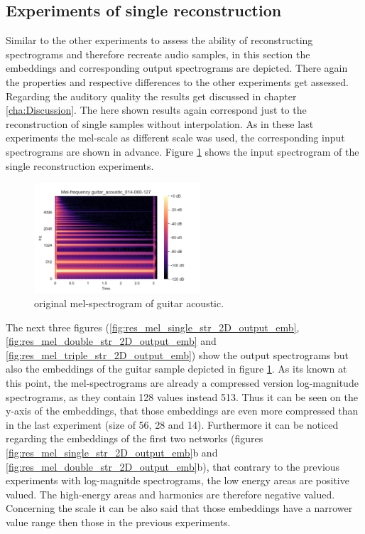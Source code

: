 \subsection{Experiments of single reconstruction}
Similar to the other experiments to assess the ability of reconstructing spectrograms and therefore recreate audio samples, in this section the embeddings and corresponding output spectrograms are depicted. There again the properties and respective differences to the other experiments get assessed. Regarding the auditory quality the results get discussed in chapter \ref{cha:Discussion}. The here shown results again correspond just to the reconstruction of single samples without interpolation. As in these last experiments the mel-scale as different scale was used, the corresponding input spectrograms are shown in advance. Figure \ref{fig:res_2D_mel_guit} shows the input spectrogram of the single reconstruction experiments.

\begin{figure}[htb!]
    \centering
    \includegraphics[width=0.55\textwidth]{images/results/mel_guitar_acoustic_014-060-127.png}
    \caption{original mel-spectrogram of guitar acoustic.}
    \label{fig:res_2D_mel_guit}
\end{figure}

The next three figures (\ref{fig:res_mel_single_str_2D_output_emb}, \ref{fig:res_mel_double_str_2D_output_emb} and \ref{fig:res_mel_triple_str_2D_output_emb}) show the output spectrograms but also the embeddings of the guitar sample depicted in figure \ref{fig:res_2D_mel_guit}. As its known at this point, the mel-spectrograms are already a compressed version log-magnitude spectrograms, as they contain 128 values instead 513. Thus it can be seen on the y-axis of the embeddings, that those embeddings are even more compressed than in the last experiment (size of 56, 28 and 14). Furthermore it can be noticed regarding the embeddings of the first two networks (figures \ref{fig:res_mel_single_str_2D_output_emb}b and \ref{fig:res_mel_double_str_2D_output_emb}b), that contrary to the previous experiments with log-magnitde spectrograms, the low energy areas are positive valued. The high-energy areas and harmonics are therefore negative valued. Concerning the scale it can be also said that those embeddings have a narrower value range then those in the previous experiments. 

